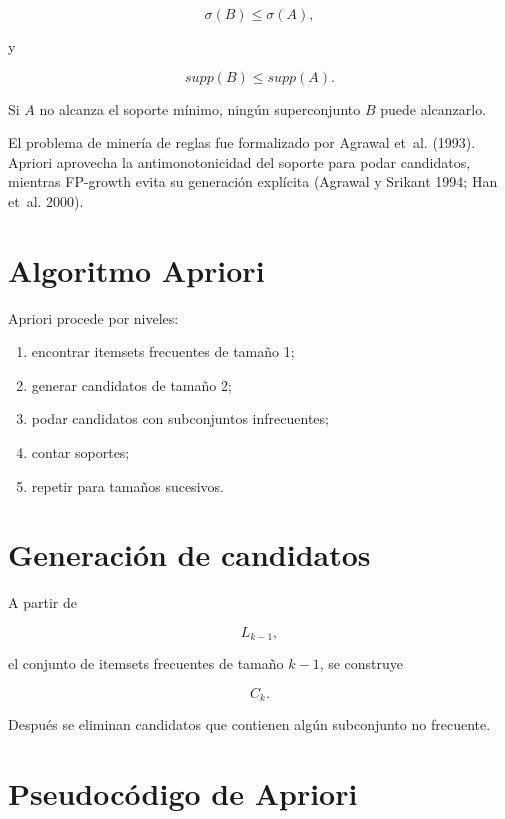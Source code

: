 \documentclass[
  spanish,
  10.5pt,
  letterpaper,
  DIV=11,
  numbers=noendperiod,
  oneside,
  open=any]{scrreprt}
\providecommand{\tightlist}{%
  \setlength{\itemsep}{0pt}\setlength{\parskip}{0pt}}
\theoremstyle{definition}
\theoremstyle{definition}
\theoremstyle{plain}
\theoremstyle{remark}
\begin{document}
\[
\sigma(B)\leq\sigma(A),
\]

y

\[
supp(B)\leq supp(A).
\]

Si \(A\) no alcanza el soporte mínimo, ningún superconjunto \(B\) puede
alcanzarlo.

El problema de minería de reglas fue formalizado por Agrawal et~al.
(1993). Apriori aprovecha la antimonotonicidad del soporte para podar
candidatos, mientras FP-growth evita su generación explícita (Agrawal y
Srikant 1994; Han et~al. 2000).

\section*{Algoritmo Apriori}\label{algoritmo-apriori}


Apriori procede por niveles:

\begin{enumerate}
\def\labelenumi{\arabic{enumi}.}
\tightlist
\item
  encontrar itemsets frecuentes de tamaño 1;
\item
  generar candidatos de tamaño 2;
\item
  podar candidatos con subconjuntos infrecuentes;
\item
  contar soportes;
\item
  repetir para tamaños sucesivos.
\end{enumerate}

\section*{Generación de candidatos}\label{generaciuxf3n-de-candidatos}


A partir de

\[
L_{k-1},
\]

el conjunto de itemsets frecuentes de tamaño \(k-1\), se construye

\[
C_k.
\]

Después se eliminan candidatos que contienen algún subconjunto no
frecuente.

\section*{Pseudocódigo de Apriori}\label{pseudocuxf3digo-de-apriori}
\end{document}
